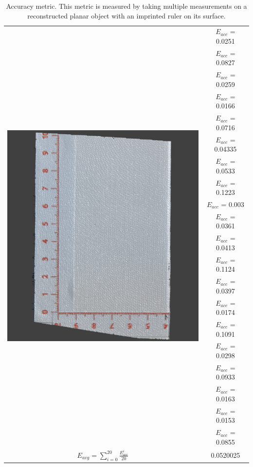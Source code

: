 \documentclass[final,12pt,3p]{elsarticle}
\begin{document}
\begin{table}[!ht]
\centering
\begin{tabular}{| c | c |}
   \hline
   \multirow{20}{*}{\includegraphics[scale=0.3]{./images/render_ruler.png}} &    $E_{acc}$ = 0.0251\\
&$E_{acc}$ = 0.0827\\
&$E_{acc}$ = 0.0259\\
&$E_{acc}$ = 0.0166\\
&$E_{acc}$ = 0.0716\\
&$E_{acc}$ = 0.04335\\
&$E_{acc}$ = 0.0533\\
&$E_{acc}$ = 0.1223\\
&$E_{acc}$ = 0.003\\
&$E_{acc}$ = 0.0361\\
&$E_{acc}$ = 0.0413\\
&$E_{acc}$ = 0.1124\\
&$E_{acc}$ = 0.0397\\
&$E_{acc}$ = 0.0174\\
&$E_{acc}$ = 0.1091\\
&$E_{acc}$ = 0.0298\\
&$E_{acc}$ = 0.0933\\
&$E_{acc}$ = 0.0163\\
&$E_{acc}$ = 0.0153\\
&$E_{acc}$ = 0.0855\\
   \hline
   $E_{avg} = \sum\limits_{i=0}^{20} \frac{E_{acc}^{i}}{20}$ & 0.0520025\\
   \hline
\end{tabular}
  \caption{\label{tab:metric3} Accuracy metric. This metric is measured by taking multiple measurements on a reconstructed planar object with an imprinted ruler on its surface.}
  \end{table}
\end{document}
